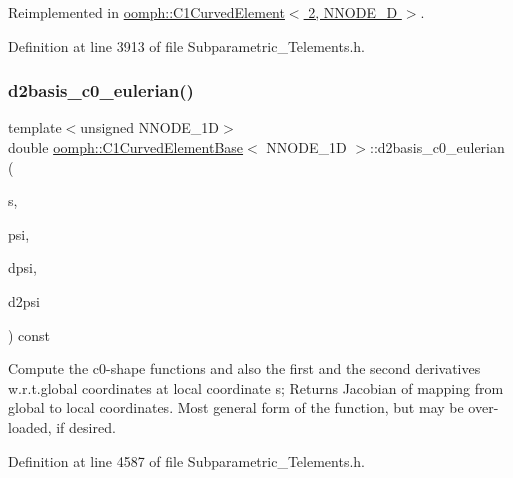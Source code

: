 Reimplemented in \hyperlink{classoomph_1_1C1CurvedElement_3_012_00_01NNODE__1D_01_4_ab7642a52d95f8b554f614b6fc5710a35}{oomph\+::\+C1\+Curved\+Element$<$ 2, N\+N\+O\+D\+E\+\_\+D $>$}.



Definition at line 3913 of file Subparametric\+\_\+\+Telements.\+h.

\mbox{\label{classoomph_1_1C1CurvedElementBase_ad4a034b3edc770df5b37cf8a15595fd8}} 
\subsubsection{\texorpdfstring{d2basis\+\_\+c0\+\_\+eulerian()}{d2basis\_c0\_eulerian()}}
{\footnotesize\ttfamily template$<$unsigned N\+N\+O\+D\+E\+\_\+1D$>$ \\
double \hyperlink{classoomph_1_1C1CurvedElementBase}{oomph\+::\+C1\+Curved\+Element\+Base}$<$ N\+N\+O\+D\+E\+\_\+1D $>$\+::d2basis\+\_\+c0\+\_\+eulerian (\begin{DoxyParamCaption}\item[{const \hyperlink{classoomph_1_1Vector}{Vector}$<$ double $>$ \&}]{s,  }\item[{\hyperlink{classoomph_1_1Shape}{Shape} \&}]{psi,  }\item[{\hyperlink{classoomph_1_1DShape}{D\+Shape} \&}]{dpsi,  }\item[{\hyperlink{classoomph_1_1DShape}{D\+Shape} \&}]{d2psi }\end{DoxyParamCaption}) const\hspace{0.3cm}{\ttfamily [inline]}}



Compute the c0-\/shape functions and also the first and the second derivatives w.\+r.\+t.\+global coordinates at local coordinate s; Returns Jacobian of mapping from global to local coordinates. Most general form of the function, but may be over-\/loaded, if desired. 



Definition at line 4587 of file Subparametric\+\_\+\+Telements.\+h.

\mbox{\label{classoomph_1_1C1CurvedElementBase_a72e258f980ba1f790e1ba0bc4ec6ef0a}} 
